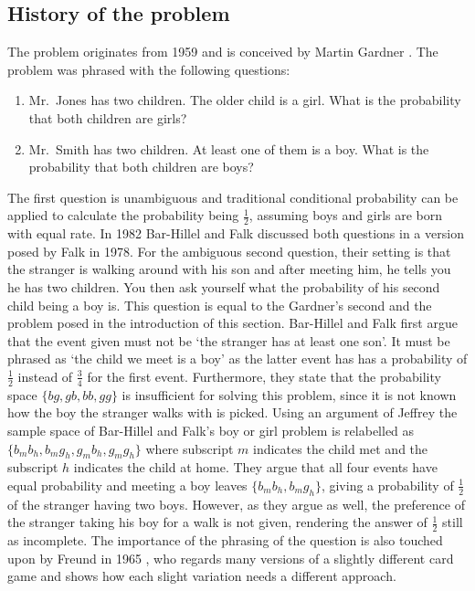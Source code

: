 \documentclass[a4paper]{report}
\theoremstyle{plain}
\theoremstyle{definition}
\theoremstyle{remark}
\numberwithin{equation}{chapter}
\DeclareMathOperator{\1}{\mathbbm{1}}
\begin{document}
\subsection{History of the problem}
The problem originates from 1959 and is conceived by Martin Gardner \cite{WikiChildren}. The problem was phrased with the following questions:
\begin{enumerate}
	\item Mr.~Jones has two children. The older child is a girl. What is the probability that both children are girls?
	\item Mr.~Smith has two children. At least one of them is a boy. What is the probability that both children are boys?
\end{enumerate}
The first question is unambiguous and traditional conditional probability can be applied to calculate the probability being $\frac{1}{2}$, assuming boys and girls are born with equal rate. In 1982 Bar-Hillel and Falk \cite{BarHillel82} discussed both questions in a version posed by Falk in 1978. For the ambiguous second question, their setting is that the stranger is walking around with his son and after meeting him, he tells you he has two children. You then ask yourself what the probability of his second child being a boy is. This question is equal to the Gardner's second and the problem posed in the introduction of this section. Bar-Hillel and Falk first argue that the event given must not be `the stranger has at least one son'. It must be phrased as `the child we meet is a boy' as the latter event has has a probability of $\frac{1}{2}$ instead of $\frac{3}{4}$ for the first event. Furthermore, they state that the probability space $\{bg,gb,bb,gg\}$ is insufficient for solving this problem, since it is not known how the boy the stranger walks with is picked. Using an argument of Jeffrey \cite{Jeffrey68} the sample space of Bar-Hillel and Falk's boy or girl problem is relabelled as $\{b_mb_h,b_mg_h,g_mb_h,g_mg_h\}$ where subscript $m$ indicates the child met and the subscript $h$ indicates the child at home. They argue that all four events have equal probability and meeting a boy leaves $\{b_mb_h,b_mg_h\}$, giving a probability of $\frac{1}{2}$ of the stranger having two boys. However, as they argue as well, the preference of the stranger taking his boy for a walk is not given, rendering the answer of $\frac{1}{2}$ still as incomplete. The importance of the phrasing of the question is also touched upon by Freund in 1965 \cite{Freund65}, who regards many versions of a slightly different card game and shows how each slight variation needs a different approach.
\end{document}
